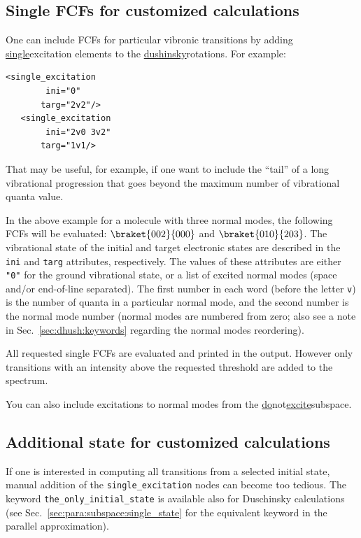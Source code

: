 \documentclass[11pt]{article}
\begin{document}
\subsection{Single FCFs for customized calculations}
\label{sec:dush:single_ex}

One can include FCFs for particular vibronic transitions by adding
\ul{single}{excitation} elements to the \ul{dushinsky}{rotations}.
For example:
\begin{lstlisting}[frame=single,framerule=0pt]
   <single_excitation
        ini="0" 
       targ="2v2"/>
   <single_excitation 
        ini="2v0 3v2"  
       targ="1v1/>
\end{lstlisting}
That may be useful, for example, if one want to include the ``tail'' of a long vibrational progression 
that goes beyond the maximum number of vibrational quanta value.

In the above example for a molecule with three normal modes, 
the following FCFs will be evaluated: $\braket{002}{000}$ and $\braket{010}{203}$.
The vibrational state of the initial and target electronic states are
described in the {\tt ini} and {\tt targ} attributes, respectively.
The values of these attributes are either {\tt "0"} for the ground vibrational state, 
or a list of excited normal modes (space and/or end-of-line separated).
The first number in each word (before the letter {\tt v}) is the number of quanta in a particular normal mode,
and the second number is the normal mode number 
(normal modes are numbered from zero; also see a note in Sec.~\ref{sec:dhush:keywords} regarding the normal modes reordering).

All requested single FCFs are evaluated and printed in the output. 
However only transitions with an intensity above the requested threshold are added to the spectrum.

You can also include excitations to normal modes from the \ul{do}{not}\ul{excite}{subspace}.

\subsection{Additional state for customized calculations}
\label{sec:dush:the_only_initial_state}

If one is interested in computing all transitions from a selected initial state, manual addition of the {\tt{}single\_excitation} nodes can become too tedious. The keyword {\tt{}the\_only\_initial\_state} is available also for Duschinsky calculations (see Sec.~\ref{sec:para:subspace:single_state} for the equivalent keyword in the parallel approximation).
\end{document}
